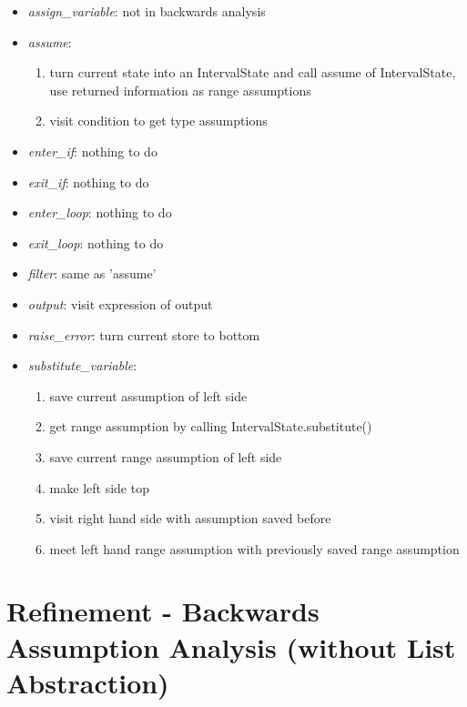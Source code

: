 \documentclass[11pt]{article}
\begin{document}
\begin{itemize}
\item \textit{assign\_variable}: not in backwards analysis
\item \textit{assume}:
\begin{enumerate}
\item turn current state into an IntervalState and call assume of IntervalState, use returned information as range assumptions
\item visit condition to get type assumptions
\end{enumerate} 
\item \textit{enter\_if}: nothing to do
\item \textit{exit\_if}: nothing to do
\item \textit{enter\_loop}: nothing to do
\item \textit{exit\_loop}: nothing to do
\item \textit{filter}: same as 'assume'
\item \textit{output}: visit expression of output
\item \textit{raise\_error}: turn current store to bottom
\item \textit{substitute\_variable}:
\begin{enumerate}
\item save current assumption of left side
\item get range assumption by calling IntervalState.substitute()
\item save current range assumption of left side
\item make left side top
\item visit right hand side with assumption saved before
\item meet left hand range assumption with previously saved range assumption
\end{enumerate}
\end{itemize}


\section{Refinement - Backwards Assumption Analysis (without List Abstraction)}
\end{document}
